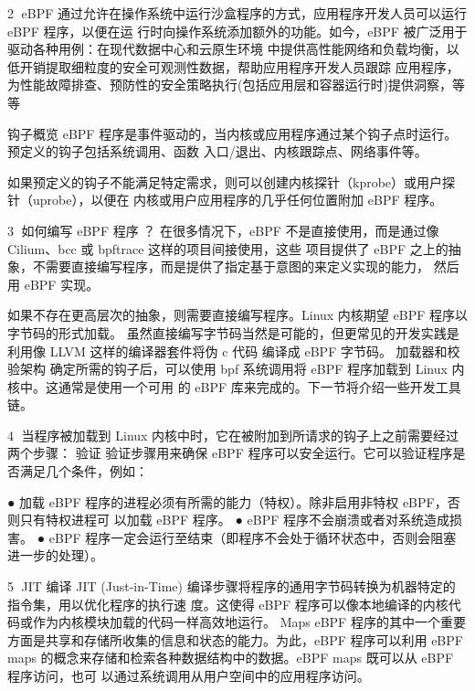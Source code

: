                                                                    2
eBPF 通过允许在操作系统中运行沙盒程序的方式，应用程序开发人员可以运行 eBPF 程序，以便在运
行时向操作系统添加额外的功能。如今，eBPF 被广泛用于驱动各种用例：在现代数据中心和云原生环境
中提供高性能网络和负载均衡，以低开销提取细粒度的安全可观测性数据，帮助应用程序开发人员跟踪
应用程序，为性能故障排查、预防性的安全策略执行(包括应用层和容器运行时)提供洞察，等等


钩子概览
eBPF 程序是事件驱动的，当内核或应用程序通过某个钩子点时运行。预定义的钩子包括系统调用、函数
入口/退出、内核跟踪点、网络事件等。




如果预定义的钩子不能满足特定需求，则可以创建内核探针（kprobe）或用户探针（uprobe），以便在
内核或用户应用程序的几乎任何位置附加 eBPF 程序。



                                                  3
如何编写 eBPF 程序 ？
在很多情况下，eBPF 不是直接使用，而是通过像 Cilium、bcc 或 bpftrace 这样的项目间接使用，这些
项目提供了 eBPF 之上的抽象，不需要直接编写程序，而是提供了指定基于意图的来定义实现的能力，
然后用 eBPF 实现。




如果不存在更高层次的抽象，则需要直接编写程序。Linux 内核期望 eBPF 程序以字节码的形式加载。
虽然直接编写字节码当然是可能的，但更常见的开发实践是利用像 LLVM 这样的编译器套件将伪 c 代码
编译成 eBPF 字节码。
加载器和校验架构
确定所需的钩子后，可以使用 bpf 系统调用将 eBPF 程序加载到 Linux 内核中。这通常是使用一个可用
的 eBPF 库来完成的。下一节将介绍一些开发工具链。


                                                          4
当程序被加载到 Linux 内核中时，它在被附加到所请求的钩子上之前需要经过两个步骤：
验证
验证步骤用来确保 eBPF 程序可以安全运行。它可以验证程序是否满足几个条件，例如：




● 加载 eBPF 程序的进程必须有所需的能力（特权）。除非启用非特权 eBPF，否则只有特权进程可
  以加载 eBPF 程序。
● eBPF 程序不会崩溃或者对系统造成损害。
● eBPF 程序一定会运行至结束（即程序不会处于循环状态中，否则会阻塞进一步的处理）。




                                                     5
JIT 编译
JIT (Just-in-Time) 编译步骤将程序的通用字节码转换为机器特定的指令集，用以优化程序的执行速
度。这使得 eBPF 程序可以像本地编译的内核代码或作为内核模块加载的代码一样高效地运行。
Maps
eBPF 程序的其中一个重要方面是共享和存储所收集的信息和状态的能力。为此，eBPF 程序可以利用
eBPF maps 的概念来存储和检索各种数据结构中的数据。eBPF maps 既可以从 eBPF 程序访问，也可
以通过系统调用从用户空间中的应用程序访问。




